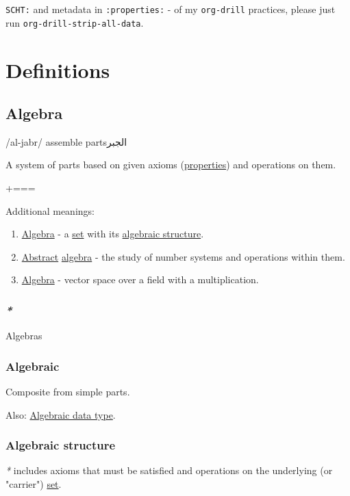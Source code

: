 \documentclass[a4paper,14pt,oneside]{book}
\newcommand{\additional}{{\scriptsize +===}}    %
\begin{document}
\texttt{SCHT:} and metadata in \texttt{:properties:} - of my \texttt{org-drill} practices, please just run \texttt{org-drill-strip-all-data}.

\part{Definitions}
\label{sec:orgdbe0830}
\chapter{\label{orgefdcb85}Algebra}
\label{sec:orgeeaa0e9}
\textenglish{ /al-jabr/ assemble parts}\textarabic{الجبر}


A system of parts based on given axioms (\hyperref[orgaebb0b7]{properties}) and operations on them.


\additional

Additional meanings:

\begin{enumerate}
\item \hyperref[orgefdcb85]{Algebra} - a \hyperref[org28abdc9]{set} with its \hyperref[org9703b42]{algebraic structure}.
\item \hyperref[org6ee4249]{Abstract} \hyperref[orgefdcb85]{algebra} - the study of number systems and operations within them.
\item \hyperref[orgefdcb85]{Algebra} - vector space over a field with a multiplication.
\end{enumerate}

\section{\emph{*}}
\label{sec:orgda1708d}

\label{orga94cecc}Algebras

\section{\label{org80a39b3}Algebraic}
\label{sec:org3be3a42}
Composite from simple parts.

Also: \hyperref[org65222de]{Algebraic data type}.

\section{\label{org9703b42}Algebraic structure}
\label{sec:org0457022}
\emph{*} includes axioms that must be satisfied and operations on the underlying (or "carrier") \hyperref[org28abdc9]{set}.
\end{document}
